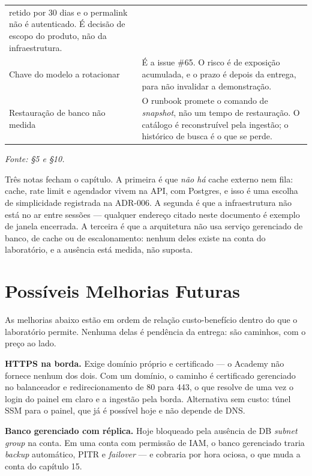 \documentclass[11pt,a4paper]{article}
\begin{document}
\begin{table}[tb]
\begin{tabularx}{\textwidth}{p{3.0cm}X}
retido por 30 dias e o permalink não é autenticado. É decisão de escopo do produto, não da
infraestrutura. \\
Chave do modelo a rotacionar & É a issue \#65. O risco é de exposição acumulada, e o prazo é depois
da entrega, para não invalidar a demonstração. \\
Restauração de banco não medida & O runbook promete o comando de \emph{snapshot}, não um tempo de
restauração. O catálogo é reconstruível pela ingestão; o histórico de busca é o que se perde. \\
\bottomrule
\end{tabularx}
{\small\itshape Fonte:  §5 e  §10.}
\end{table}

Três notas fecham o capítulo. A primeira é que \emph{não há} cache externo nem fila: cache, rate
limit e agendador vivem na API, com Postgres, e isso é uma escolha de simplicidade registrada na
ADR-006. A segunda é que a infraestrutura não está no ar entre sessões --- qualquer endereço citado
neste documento é exemplo de janela encerrada. A terceira é que a arquitetura não usa serviço
gerenciado de banco, de cache ou de escalonamento: nenhum deles existe na conta do laboratório, e a
ausência está medida, não suposta.

\section{Possíveis Melhorias Futuras}

As melhorias abaixo estão em ordem de relação custo-benefício dentro do que o laboratório permite.
Nenhuma delas é pendência da entrega: são caminhos, com o preço ao lado.

\textbf{HTTPS na borda.} Exige domínio próprio e certificado --- o Academy não fornece nenhum dos
dois. Com um domínio, o caminho é certificado gerenciado no balanceador e redirecionamento de 80 para
443, o que resolve de uma vez o login do painel em claro e a ingestão pela borda. Alternativa sem
custo: túnel SSM para o painel, que já é possível hoje e não depende de DNS.

\textbf{Banco gerenciado com réplica.} Hoje bloqueado pela ausência de DB \emph{subnet group} na
conta. Em uma conta com permissão de IAM, o banco gerenciado traria \emph{backup} automático, PITR e
\emph{failover} --- e cobraria por hora ociosa, o que muda a conta do capítulo 15.
\end{document}
